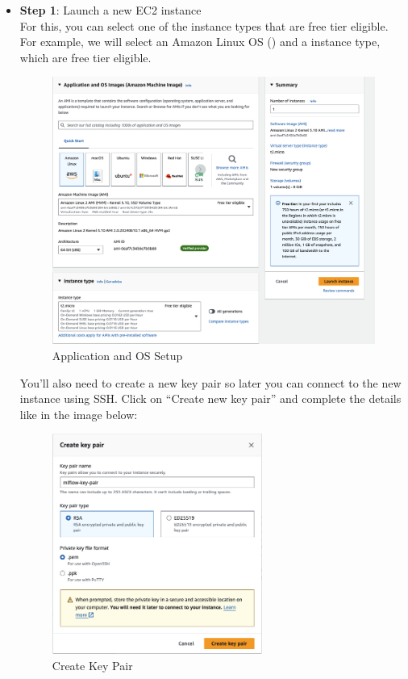 \documentclass[letterpaper,12pt,notitlepage,twoside]{report}
\begin{document}
 \begin{itemize}
\item \textbf{Step 1}: Launch a new EC2 instance \\
For this, you can select one of the instance types that are free tier eligible. For example, we will select an Amazon Linux OS () and a  instance type, which are free tier eligible.
\begin{figure}[h]
	\centering
	\includegraphics[width=\textwidth]{Images/EC2-setup.png}
	\caption{Application and OS Setup}
	\label{fig:6}
\end{figure}
\FloatBarrier
You'll also need to create a new key pair so later you can connect to the new instance using SSH. Click on ``Create new key pair'' and complete the details like in the image below:
\begin{figure}[h]
	\centering
	\includegraphics[width=0.65\textwidth]{Images/mlflow-key-pair.png}
	\caption{Create Key Pair}
	\label{fig:7}
\end{figure}
\FloatBarrier


\end{itemize}
\end{document}
